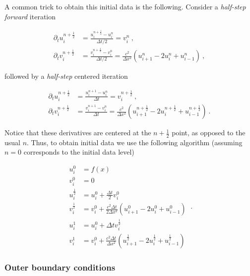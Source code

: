 \documentclass[a4paper,11pt]{article}
\begin{document}
A common trick to obtain this initial data is the following. Consider a \emph{half-step forward} iteration

\begin{equation}
\begin{aligned}
\partial_{t}u^{n+\frac{1}{2}}_{i} &= \frac{u^{n+\frac{1}{2}}_{i} - u^{n}_{i}}{\Delta t/2} = v^{n}_{i}\ ,\\
\partial_{t}v^{n+\frac{1}{2}}_{i} &= \frac{v^{n+\frac{1}{2}}_{i} - v^{n}_{i}}{\Delta t/2} = \frac{c^{2}}{\Delta x^{2}}\left(u^{n}_{i+1}-2u^{n}_{i}+u^{n}_{i-1}\right)\ ,
\end{aligned}
\end{equation}

\noindent followed by a \emph{half-step} centered iteration

\begin{equation}
\begin{aligned}
\partial_{t}u^{n+\frac{1}{2}}_{i} &= \frac{u^{n+1}_{i} - u^{n}_{i}}{\Delta t} = v^{n+\frac{1}{2}}_{i}\ ,\\
\partial_{t}v^{n+\frac{1}{2}}_{i} &= \frac{v^{n+1}_{i} - v^{n}_{i}}{\Delta t} = \frac{c^{2}}{\Delta x^{2}}\left(u^{n+\frac{1}{2}}_{i+1}-2u^{n+\frac{1}{2}}_{i}+u^{n+\frac{1}{2}}_{i-1}\right)\ .
\end{aligned}
\end{equation}

\noindent Notice that these derivatives are centered at the $n+\frac{1}{2}$ point, as opposed to the usual $n$. Thus, to obtain initial data we use the following algorithm (assuming $n=0$ corresponds to the initial data level)

\begin{equation}
\boxed{
\begin{aligned}
u_{i}^{0} &= f(x)\\
v_{i}^{0} &= 0\\
u^{\frac{1}{2}}_{i} &= u^{0}_{i} + \frac{\Delta t}{2}v^{0}_{i}\\
v^{\frac{1}{2}}_{i} &= v^{0}_{i} + \frac{c^{2}\Delta t}{2\Delta x^{2}}\left(u^{0}_{i+1}-2u^{0}_{i}+u^{0}_{i-1}\right)\\
u^{1}_{i} &= u^{0}_{i} + \Delta t v^{\frac{1}{2}}_{i}\\
v^{1}_{i} &= v^{0}_{i} + \frac{c^{2}\Delta t}{\Delta x^{2}}\left(u^{\frac{1}{2}}_{i+1}-2u^{\frac{1}{2}}_{i}+u^{\frac{1}{2}}_{i-1}\right)
\end{aligned}
}\ .
\end{equation}

\subsubsection{Outer boundary conditions}
\end{document}
